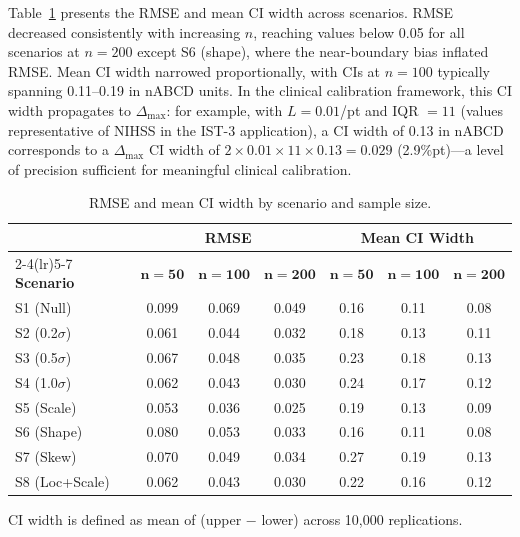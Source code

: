 \documentclass[AMA,Times1COL]{WileyNJDv5}
\begin{document}
Table~\ref{tab:precision} presents the RMSE and mean CI width across scenarios. RMSE decreased consistently with increasing $n$, reaching values below 0.05 for all scenarios at $n = 200$ except S6 (shape), where the near-boundary bias inflated RMSE. Mean CI width narrowed proportionally, with CIs at $n = 100$ typically spanning 0.11--0.19 in nABCD units. In the clinical calibration framework, this CI width propagates to $\Delta_{\max}$: for example, with $L = 0.01$/pt and IQR $= 11$ (values representative of NIHSS in the IST-3 application), a CI width of 0.13 in nABCD corresponds to a $\Delta_{\max}$ CI width of $2 \times 0.01 \times 11 \times 0.13 = 0.029$ (2.9\%pt)---a level of precision sufficient for meaningful clinical calibration.

\begin{table}[ht]
\caption{RMSE and mean CI width by scenario and sample size.\label{tab:precision}}
\begin{tabular*}{\textwidth}{@{\extracolsep\fill}lcccccc@{}}
\toprule
& \multicolumn{3}{c}{\textbf{RMSE}} & \multicolumn{3}{c}{\textbf{Mean CI Width}} \\
\cmidrule(lr){2-4}\cmidrule(lr){5-7}
\textbf{Scenario} & $\boldsymbol{n=50}$ & $\boldsymbol{n=100}$ & $\boldsymbol{n=200}$ & $\boldsymbol{n=50}$ & $\boldsymbol{n=100}$ & $\boldsymbol{n=200}$ \\
\midrule
S1 (Null) & 0.099 & 0.069 & 0.049 & 0.16 & 0.11 & 0.08 \\
S2 (0.2$\sigma$) & 0.061 & 0.044 & 0.032 & 0.18 & 0.13 & 0.11 \\
S3 (0.5$\sigma$) & 0.067 & 0.048 & 0.035 & 0.23 & 0.18 & 0.13 \\
S4 (1.0$\sigma$) & 0.062 & 0.043 & 0.030 & 0.24 & 0.17 & 0.12 \\
S5 (Scale) & 0.053 & 0.036 & 0.025 & 0.19 & 0.13 & 0.09 \\
S6 (Shape) & 0.080 & 0.053 & 0.033 & 0.16 & 0.11 & 0.08 \\
S7 (Skew) & 0.070 & 0.049 & 0.034 & 0.27 & 0.19 & 0.13 \\
S8 (Loc+Scale) & 0.062 & 0.043 & 0.030 & 0.22 & 0.16 & 0.12 \\
\bottomrule
\end{tabular*}
\begin{tablenotes}
\item CI width is defined as mean of (upper $-$ lower) across 10{,}000 replications.
\end{tablenotes}
\end{table}
\end{document}
